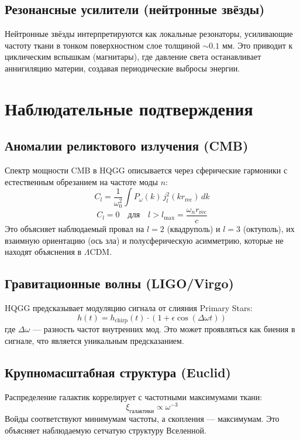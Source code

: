 \documentclass[12pt,a4paper]{article}
\begin{document}
\subsection{Резонансные усилители (нейтронные звёзды)}

Нейтронные звёзды интерпретируются как локальные резонаторы, усиливающие частоту ткани в тонком поверхностном слое толщиной \(\sim 0.1\) мм. Это приводит к циклическим вспышкам (магнитары), где давление света останавливает аннигиляцию материи, создавая периодические выбросы энергии.

\section{Наблюдательные подтверждения}

\subsection{Аномалии реликтового излучения (CMB)}

Спектр мощности CMB в HQGG описывается через сферические гармоники с естественным обрезанием на частоте моды \( n \):
\[
C_l = \frac{1}{\omega_0^2} \int P_\omega(k) \, j_l^2(k r_{\text{rec}}) \, dk
\]
\[
C_l = 0 \quad \text{для} \quad l > l_{\max} = \frac{\omega_n r_{\text{rec}}}{c}
\]
Это объясняет наблюдаемый провал на \( l=2 \) (квадруполь) и \( l=3 \) (октуполь), их взаимную ориентацию (ось зла) и полусферическую асимметрию, которые не находят объяснения в \(\Lambda\)CDM.

\subsection{Гравитационные волны (LIGO/Virgo)}

HQGG предсказывает модуляцию сигнала от слияния Primary Stars:
\[
h(t) = h_{\text{chirp}}(t) \cdot \left(1 + \epsilon \cos(\Delta \omega t)\right)
\]
где \(\Delta \omega\) — разность частот внутренних мод. Это может проявляться как биения в сигнале, что является уникальным предсказанием.

\subsection{Крупномасштабная структура (Euclid)}

Распределение галактик коррелирует с частотными максимумами ткани:
\[
\xi_{\text{галактики}} \propto \omega^{-3}
\]
Войды соответствуют минимумам частоты, а скопления — максимумам. Это объясняет наблюдаемую сетчатую структуру Вселенной.
\end{document}
